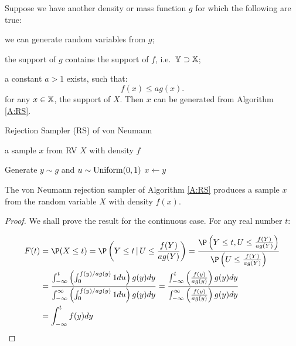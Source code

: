 Suppose we have another density or mass function $g$ for which the following are true:
\begin{asparaenum}[(a)]
\item	we can generate random variables from $g$;
\item	the support of $g$ contains the support of $f$, i.e.~$\mathbb{Y} \supset \mathbb{X}$;
\item	a constant $a > 1$ exists, such that:
\begin{equation}
f(x)\leq ag(x).
\end{equation}
for any $x\in \mathbb{X}$, the support of $X$.  Then $x$ can be generated from Algorithm \ref*{A:RS}.
\end{asparaenum}

\begin{algorithm}
\caption{Rejection Sampler (RS) of von Neumann}
\label{A:RS}
\begin{algorithmic}[1]
 a sample $x$ from RV $X$ with density $f$

\REPEAT
\STATE Generate $y \sim g$ and $u \sim \mbox{{\rm Uniform}}(0,1)$
 $x \gets y$
\end{algorithmic}
\end{algorithm}

\begin{prop}  The von Neumann rejection sampler of Algorithm \ref*{A:RS} produces a sample $x$ from the random variable $X$ with density $f(x)$.
\begin{proof}
We shall prove the result for the continuous case. For any real number $t$:

\begin{eqnarray*}
F(t) &= \P(X \leq t) = \P\left(Y \leq t  \, | \, U \leq\frac{f(Y)}{ag(Y)} \right)
=\frac{\P\left(Y \leq t, U \leq\frac{f(Y)}{ag(Y)} \right)}{\P\left(U \leq\frac{f(Y)}{ag(Y)}\right)}\\
&=\frac{\int^t_{-\infty}\left(\int^{f(y)/ag(y)}_0 1 du\right)g(y)dy}{\int^{\infty}_{-\infty}\left(\int^{f(y)/ag(y)}_0 1 du\right)g(y)dy}
=\frac{\int^t_{-\infty}\left(\frac{f(y)}{ag(y)} \right)g(y)dy}{\int^{\infty}_{-\infty}\left(\frac{f(y)}{ag(y)} \right)g(y)dy}\\
&=\int^t_{-\infty}f(y)dy
\end{eqnarray*}
\end{proof}
\end{prop}

